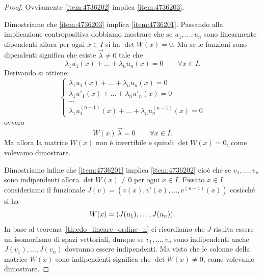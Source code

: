 \begin{proof}
Ovviamente \ref{item:4736202} implica \ref{item:4736203}.

Dimostriamo che \ref{item:4736203} implica \ref{item:4736201}.
Passando alla implicazione contropositiva dobbiamo mostrare che
se $u_1,\dots, u_n$ sono linearmente dipendenti allora per ogni $x\in I$ si ha $\det W(x)=0$. Ma se le funzioni sono dipendenti significa che esiste $\vec \lambda \neq 0$ tale che
\begin{equation}\label{eq:3675893}
  \lambda_1 u_1(x) + \dots + \lambda_n u_n(x) = 0 \qquad \forall x\in I.
\end{equation}
Derivando si ottiene:
\[
\begin{cases}
  \lambda_1 u_1(x) + \dots + \lambda_n u_n(x) = 0\\
  \lambda_1 u'_1(x) + \dots + \lambda_n u'_n(x) = 0\\
  \dots\\
  \lambda_1 u^{(n-1)}_1(x) + \dots + \lambda_n u^{(n-1)}_n(x) = 0
\end{cases}
\]
ovvero
\[
  W(x) \, \vec \lambda = 0 \qquad \forall x\in I.
\]
Ma allora la matrice $W(x)$ non è invertibile e quindi $\det W(x)=0$, come volevamo dimostrare.

Dimostriamo infine che \ref{item:4736201} implica \ref{item:4736202}
cioè che se $v_1, \dots, v_n$ sono indipendenti allora $\det W(x) \neq 0$ per ogni $x\in I$.
Fissato $x\in I$ consideriamo il funzionale $J(v) = (v(x),v'(x), \dots, v^{(n-1)}(x))$ cosicché si ha
\[
  W(x) = {\left( J(u_1), \dots, J(u_n) \right)}.
\]
In base al teorema~\ref{th:edo_lineare_ordine_n} ci ricordiamo che $J$ risulta essere un isomorfismo di spazi vettoriali, dunque se $v_1,\dots,v_n$ sono indipendenti anche $J(v_1),\dots, J(v_n)$ dovranno essere indipendenti.
Ma visto che le colonne della matrice $W(x)$ sono indipendenti significa che $\det W(x)\neq 0$, come volevamo dimostrare.
\end{proof}

